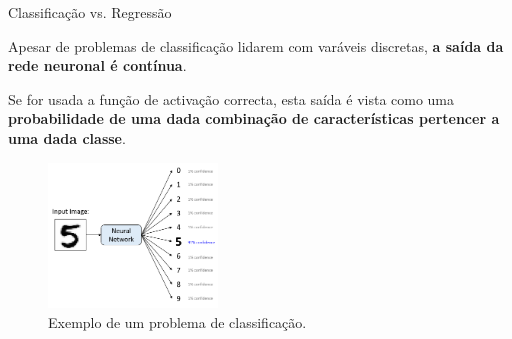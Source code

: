 \begin{frame}{Classificação vs. Regressão \cont}

Apesar de problemas de classificação lidarem com varáveis discretas, \textbf{a saída da rede neuronal é contínua}.

\pauseskip

Se for usada a função de activação correcta, esta saída é vista como uma \textbf{probabilidade de uma dada combinação de características pertencer a uma dada classe}.

\begin{figure}
    \centering
    \includegraphics[width=4.5cm]{img/classification.png}
    \caption{Exemplo de um problema de classificação.}
\end{figure}


\end{frame}

